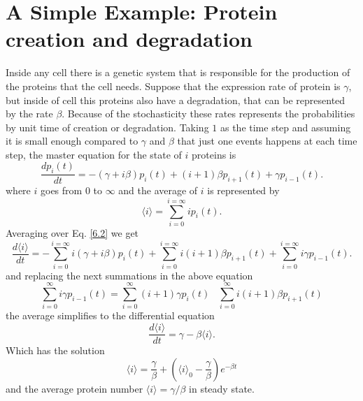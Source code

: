 \section{A Simple Example: Protein creation and degradation}
Inside any cell there is a genetic system that is  responsible for the production of the proteins that the cell needs. Suppose that the expression rate of protein is $\gamma$, but inside of cell this proteins also have a degradation, that can be represented by the rate $\beta$. Because of the stochasticity these rates represents the probabilities by unit time of creation or degradation.
Taking $1$ as the time step and assuming it is small enough compared to $\gamma$ and $\beta$ that just one events happens at each time step\cite{Pedraza1,Thattai},  the master equation  for the state of $i$ proteins is
\begin{equation}\label{6.2}
\frac{dp_i(t)}{dt}=-(\gamma + i\beta)p_i(t) + (i+1)\beta p_{i+1}(t) + \gamma p_{i-1}(t).
\end{equation} 
where $i$ goes from $0$ to $\infty$ and the average of $i$ is represented by
\begin{equation}
\langle i\rangle=\sum\limits_{i=0}^{i=\infty}ip_i (t).
\end{equation}
Averaging over Eq. \eqref{6.2} we get
\begin{equation}
\frac{d \langle i\rangle}{dt}=-\sum\limits_{i=0}^{i=\infty}i(\gamma + i\beta)p_i(t) + \sum\limits_{i=0}^{i=\infty}i(i+1)\beta p_{i+1}(t) + \sum\limits_{i=0}^{i=\infty}i \gamma p_{i-1}(t).
\end{equation}
and replacing the next summations in the above equation
\begin{equation}
\sum\limits_{i=0}^{\infty}i\gamma p_{i-1}(t)=\sum\limits_{i=0}^{\infty}(i+1)\gamma p_{i}(t)\;\;\; 	\sum\limits_{i=0}^{\infty}i(i+1)\beta p_{i+1}(t)
\end{equation} 
the average  simplifies to the differential equation
\begin{equation}
\frac{d \langle i\rangle}{dt} = \gamma - \beta \langle i \rangle.
\end{equation}
Which has the solution
\begin{equation}
\langle i \rangle =\frac{\gamma}{\beta}+\left(\langle i\rangle_0 -\frac{\gamma}{\beta}\right)e^{-\beta t}
\end{equation}
and the average protein number $\langle i\rangle=\gamma/\beta$ in steady state.

